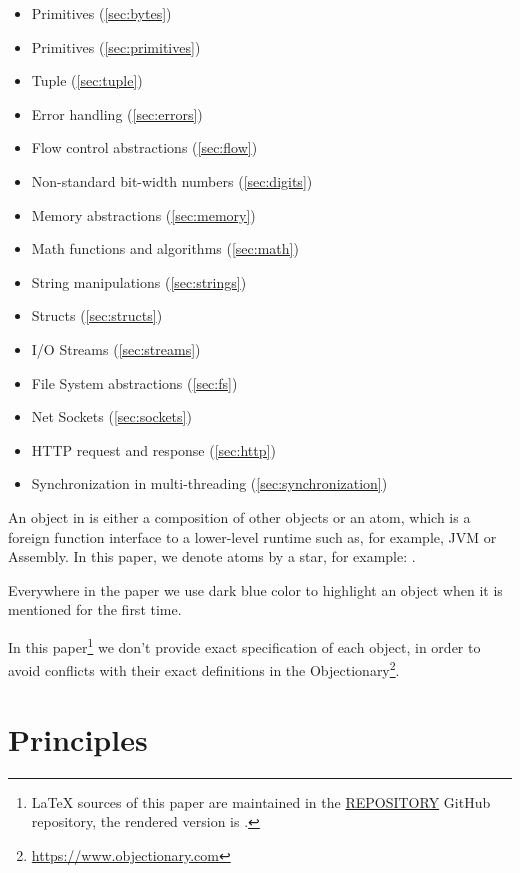 \documentclass[sigplan,nonacm]{acmart}
\newcommand\aff[1]{\ff{\textcolor{gray}{\(\star\)}#1}}
\begin{document}
\begin{itemize}
    \item Primitives (\cref{sec:bytes})
    \item Primitives (\cref{sec:primitives})
    \item Tuple (\cref{sec:tuple})
    \item Error handling (\cref{sec:errors})
    \item Flow control abstractions (\cref{sec:flow})
    \item Non-standard bit-width numbers (\cref{sec:digits})
    \item Memory abstractions (\cref{sec:memory})
    \item Math functions and algorithms (\cref{sec:math})
    \item String manipulations (\cref{sec:strings})
    \item Structs (\cref{sec:structs})
    \item I/O Streams (\cref{sec:streams})
    \item File System abstractions (\cref{sec:fs})
    \item Net Sockets (\cref{sec:sockets})
    \item HTTP request and response (\cref{sec:http})
    \item Synchronization in multi-threading (\cref{sec:synchronization})
\end{itemize}

An object in \eolang{} is either a composition of other objects or an atom, which is a
foreign function interface to a lower-level runtime such as, for example, JVM
or Assembly. In this paper, we denote atoms by a star, for example:
\aff{times}.

Everywhere in the paper we use dark blue color to highlight an object when it is
mentioned for the first time.

In this paper\footnote{%
\LaTeX{} sources of this paper are maintained in the
\href{https://github.com/REPOSITORY}{REPOSITORY} GitHub repository,
the rendered version is \href{https://github.com/REPOSITORY/releases/tag/0.0.0}{}.}
we don't provide exact specification of each object, in order to avoid
conflicts with their exact definitions in the
Objectionary\footnote{\url{https://www.objectionary.com}}.

\section{Principles}
\end{document}
